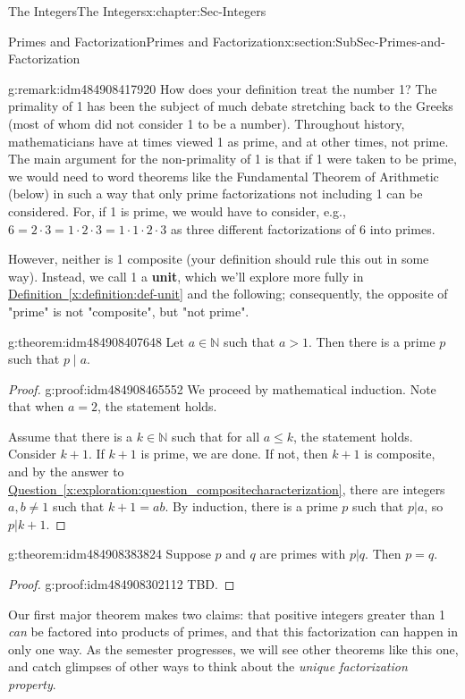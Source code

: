 \documentclass[oneside,10pt,]{book}
\newcommand{\xreffont}{\relax}
\newcommand{\terminology}[1]{\textbf{#1}}
\numberwithin{equation}{section}
\renewcommand{\le}{\leqslant}
\def\N{{\mathbb N}}
\begin{document}
\begin{chapterptx}{The Integers}{}{The Integers}{}{}{x:chapter:Sec-Integers}
\begin{sectionptx}{Primes and Factorization}{}{Primes and Factorization}{}{}{x:section:SubSec-Primes-and-Factorization}
\begin{remark}{}{g:remark:idm484908417920}
How does your definition treat the number 1? The primality of 1 has been the subject of much debate stretching back to the Greeks (most of whom did not consider 1 to be a number). Throughout history, mathematicians have at times viewed 1 as prime, and at other times, not prime. The main argument for the non-primality of 1 is that if 1 were taken to be prime, we would need to word theorems like the Fundamental Theorem of Arithmetic (below) in such a way that only prime factorizations not including 1 can be considered. For, if 1 is prime, we would have to consider, e.g., \(6 = 2\cdot 3 = 1\cdot 2 \cdot 3 = 1\cdot 1\cdot 2\cdot 3\) as three different factorizations of 6 into primes.%
\par
However, neither is 1 composite (your definition should rule this out in some way). Instead, we call 1 a \terminology{unit}, which we'll explore more fully in \hyperref[x:definition:def-unit]{Definition~{\xreffont\ref{x:definition:def-unit}}} and the following; consequently, the opposite of "prime" is not "composite", but "not prime".%
\end{remark}
\begin{theorem}{}{}{g:theorem:idm484908407648}%
Let \(a\in \N\) such that \(a > 1\). Then there is a prime \(p\) such that \(p\mid a\).%
\end{theorem}
\begin{proof}{}{g:proof:idm484908465552}
We proceed by mathematical induction. Note that when \(a = 2\), the statement holds.%
\par
Assume that there is a \(k\in\N\) such that for all \(a\le k\), the statement holds. Consider \(k+1\). If \(k+1\) is prime, we are done. If not, then \(k+1\) is composite, and by the answer to \hyperref[x:exploration:question_compositecharacterization]{Question~{\xreffont\ref{x:exploration:question_compositecharacterization}}}, there are integers \(a,b\ne 1\) such that \(k+1 = ab\). By induction, there is a prime \(p\) such that \(p|a\), so \(p|k+1\).%
\end{proof}
\begin{theorem}{}{}{g:theorem:idm484908383824}%
Suppose \(p\) and \(q\) are primes with \(p|q\). Then \(p = q\).%
\end{theorem}
\begin{proof}{}{g:proof:idm484908302112}
TBD.\end{proof}
Our first major theorem makes two claims: that positive integers greater than 1 \emph{can} be factored into products of primes, and that this factorization can happen in only one way. As the semester progresses, we will see other theorems like this one, and catch glimpses of other ways to think about the \emph{unique factorization property}.%

\end{sectionptx}
\end{chapterptx}
\end{document}
